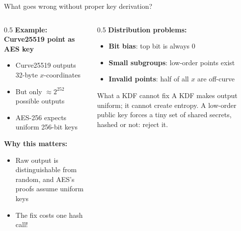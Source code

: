 \ifdefined\PRESENTATION\else\PassOptionsToClass{handout}{beamer}\fi\documentclass[aspectratio=169, lualatex]{beamer}
\begin{document}
\begin{frame}{What goes wrong without proper key derivation?}
	\begin{columns}[c]
		\begin{column}{0.5\textwidth}
			\textbf{Example: Curve25519 point as AES key}
			\begin{itemize}
				\item Curve25519 outputs 32-byte $x$-coordinates
				\item But only $\approx 2^{252}$ possible outputs
				\item AES-256 expects uniform 256-bit keys
			\end{itemize}
			\textbf{Why this matters:}
			\begin{itemize}
				\item Raw output is distinguishable from random, and AES's proofs assume uniform keys
				\item The fix costs one hash call!
			\end{itemize}
		\end{column}
		\begin{column}{0.5\textwidth}
			\textbf{Distribution problems:}
			\begin{itemize}
				\item \textbf{Bit bias}: top bit is always $0$
				\item \textbf{Small subgroups}: low-order points exist
				\item \textbf{Invalid points}: half of all $x$ are off-curve
			\end{itemize}
			\begin{alertblock}{What a KDF cannot fix}
				A KDF makes output uniform; it cannot create entropy. A low-order public key forces a tiny set of shared secrets, hashed or not: reject it.
			\end{alertblock}
		\end{column}
	\end{columns}
\end{frame}
\end{document}
